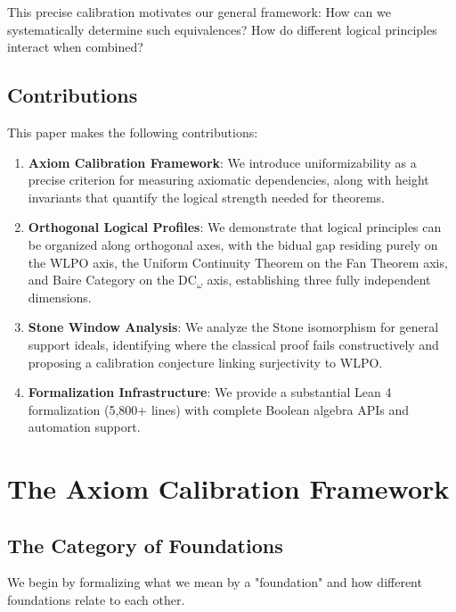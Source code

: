 \documentclass[11pt]{article}
\newcommand{\DCw}{\mathrm{DC}_\omega}
\begin{document}
This precise calibration motivates our general framework: How can we systematically determine such equivalences? How do different logical principles interact when combined?

\subsection{Contributions}

This paper makes the following contributions:

\begin{enumerate}
\item \textbf{Axiom Calibration Framework}: We introduce uniformizability as a precise criterion for measuring axiomatic dependencies, along with height invariants that quantify the logical strength needed for theorems.

\item \textbf{Orthogonal Logical Profiles}: We demonstrate that logical principles can be organized along orthogonal axes, with the bidual gap residing purely on the WLPO axis, the Uniform Continuity Theorem on the Fan Theorem axis, and Baire Category on the $\DCw$ axis, establishing three fully independent dimensions.

\item \textbf{Stone Window Analysis}: We analyze the Stone isomorphism for general support ideals, identifying where the classical proof fails constructively and proposing a calibration conjecture linking surjectivity to WLPO.

\item \textbf{Formalization Infrastructure}: We provide a substantial Lean 4 formalization (5,800+ lines) with complete Boolean algebra APIs and automation support.
\end{enumerate}

\section{The Axiom Calibration Framework}

\subsection{The Category of Foundations}

We begin by formalizing what we mean by a "foundation" and how different foundations relate to each other.
\end{document}
